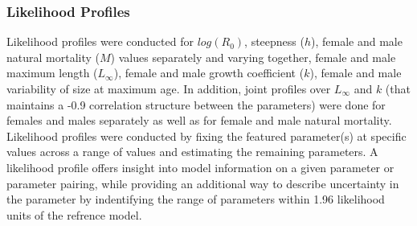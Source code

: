 \documentclass[11pt,
  english,
  a4paper,
]{article}
\begin{document}
\leavevmode\tagmcend\tagstructend\par


\hypertarget{likelihood-profiles}{%
\subsubsection{Likelihood Profiles}\label{likelihood-profiles}}

\leavevmode\tagmcend\tagstructend


Likelihood profiles were conducted for {\(log(R_0)\)\leavevmode\tagmcend\tagstructend}, steepness ({\(h\)\leavevmode\tagmcend\tagstructend}), female and male natural mortality ({\(M\)\leavevmode\tagmcend\tagstructend}) values separately and varying together, female and male maximum length ({\(L_{\infty}\)\leavevmode\tagmcend\tagstructend}), female and male growth coefficient ({\(k\)\leavevmode\tagmcend\tagstructend}), female and male variability of size at maximum age. In addition, joint profiles over {\(L_{\infty}\)\leavevmode\tagmcend\tagstructend} and {\(k\)\leavevmode\tagmcend\tagstructend} (that maintains a -0.9 correlation structure between the parameters) were done for females and males separately as well as for female and male natural mortality. Likelihood profiles were conducted by fixing the featured parameter(s) at specific values across a range of values and estimating the remaining parameters. A likelihood profile offers insight into model information on a given parameter or parameter pairing, while providing an additional way to describe uncertainty in the parameter by indentifying the range of parameters within 1.96 likelihood units of the refrence model.

\leavevmode\tagmcend\tagstructend\par

\end{document}
